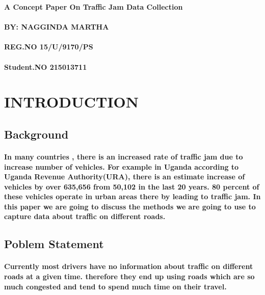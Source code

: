 \documentclass{article}
\begin{document}
\begin{titlepage}
	\begin{center}
	\huge{\bfseries A Concept Paper On Traffic Jam Data Collection }\\

	\end{center}

 \paragraph{BY: NAGGINDA MARTHA}
	\paragraph{REG.NO 15/U/9170/PS}
    \paragraph{Student.NO 215013711}
\end{titlepage}

\cleardoublepage

\tableofcontents
\thispagestyle{empty}
\cleardoublepage
{}

\section{INTRODUCTION}
\subsection{Background}
\paragraph{In many countries , there is an increased rate of traffic jam due to increase number of vehicles. For example in Uganda according to Uganda Revenue Authority(URA), there is an estimate increase of vehicles by over 635,656 from 50,102 in the last 20 years. 80 percent of these vehicles operate in urban areas there by leading to traffic jam. 
In this paper we are going to discuss the methods we are going to use to capture data about traffic on different roads.}
\subsection{Poblem Statement}
\paragraph{Currently most drivers have no information about traffic  on different roads at a given time. therefore they end up using roads which are so much congested and tend to spend much time on their travel.}
\end{document}
